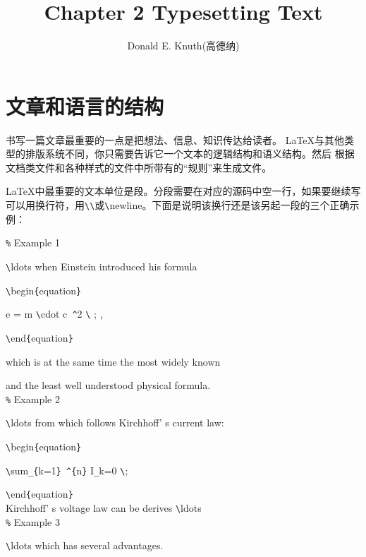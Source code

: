 \documentclass[UTF8]{ctexart}
\title{\heiti Chapter 2 Typesetting Text}
\author{ Donald E. Knuth(高德纳)}
\begin{document}
\maketitle

\tableofcontents

\newpage
\section{文章和语言的结构}
书写一篇文章最重要的一点是把想法、信息、知识传达给读者。 \LaTeX 与其他类型的排版系统不同，你只需要告诉它一个文本的逻辑结构和语义结构。然后
根据文档类文件和各种样式的文件中所带有的“规则”来生成文件。

\LaTeX 中最重要的文本单位是段。分段需要在对应的源码中空一行，如果要继续写可以用换行符，用\texttt{\textbackslash}\texttt{\textbackslash}或\texttt{\textbackslash}newline。下面是说明该换行还是该另起一段的三个正确示例：

\texttt{\%} Example 1

\texttt{\textbackslash}ldots when Einstein introduced his formula

\texttt{\textbackslash}begin\texttt{\{}equation\texttt{\}}

   \qquad e = m \texttt{\textbackslash}cdot c\texttt{~\^}2 \texttt{\textbackslash} ; ,

\texttt{\textbackslash}end\texttt{\{}equation\texttt{\}}

which is at the same time the most widely known

and the least well understood physical formula.
\\

\texttt{\%} Example 2

\texttt{\textbackslash}ldots from which follows Kirchhoff' s current law:

\texttt{\textbackslash}begin\texttt{\{}equation\texttt{\}}

  \qquad \texttt{\textbackslash}sum\texttt{\_}\texttt{\{}k=1\texttt{\}}\texttt{~\^}\texttt{\{}n\texttt{\}}  I\texttt{\_}k=0 \texttt{\textbackslash};

\texttt{\textbackslash}end\texttt{\{}equation\texttt{\}}
\\

Kirchhoff' s voltage law can be derives \texttt{\textbackslash}ldots
\\

\texttt{\%} Example 3

\texttt{\textbackslash}ldots which has several advantages.
\end{document}
